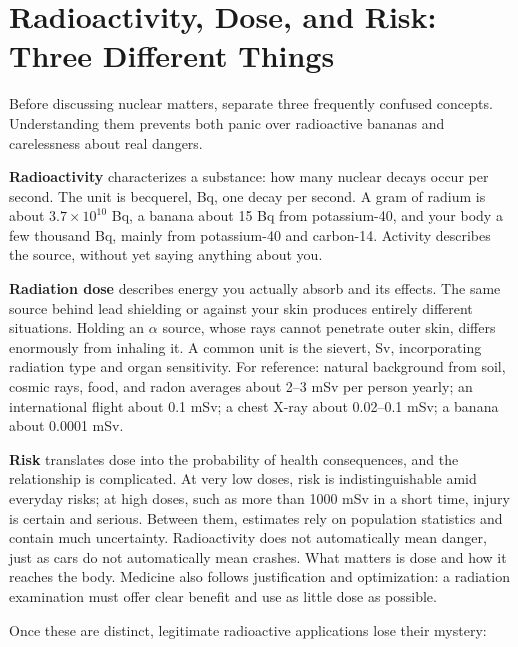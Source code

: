 \section{Radioactivity, Dose, and Risk: Three Different Things}

Before discussing nuclear matters, separate three frequently confused concepts. Understanding them prevents both panic over radioactive bananas and carelessness about real dangers.

\textbf{Radioactivity} characterizes a substance: how many nuclear decays occur per second. The unit is becquerel, Bq, one decay per second. A gram of radium is about $3.7\times 10^{10}$ Bq, a banana about 15 Bq from potassium-40, and your body a few thousand Bq, mainly from potassium-40 and carbon-14. Activity describes the source, without yet saying anything about you.

\textbf{Radiation dose} describes energy you actually absorb and its effects. The same source behind lead shielding or against your skin produces entirely different situations. Holding an $\alpha$ source, whose rays cannot penetrate outer skin, differs enormously from inhaling it. A common unit is the sievert, Sv, incorporating radiation type and organ sensitivity. For reference: natural background from soil, cosmic rays, food, and radon averages about 2--3 mSv per person yearly; an international flight about 0.1 mSv; a chest X-ray about 0.02--0.1 mSv; a banana about 0.0001 mSv.

\textbf{Risk} translates dose into the probability of health consequences, and the relationship is complicated. At very low doses, risk is indistinguishable amid everyday risks; at high doses, such as more than 1000 mSv in a short time, injury is certain and serious. Between them, estimates rely on population statistics and contain much uncertainty. Radioactivity does not automatically mean danger, just as cars do not automatically mean crashes. What matters is dose and how it reaches the body. Medicine also follows justification and optimization: a radiation examination must offer clear benefit and use as little dose as possible.

Once these are distinct, legitimate radioactive applications lose their mystery:

